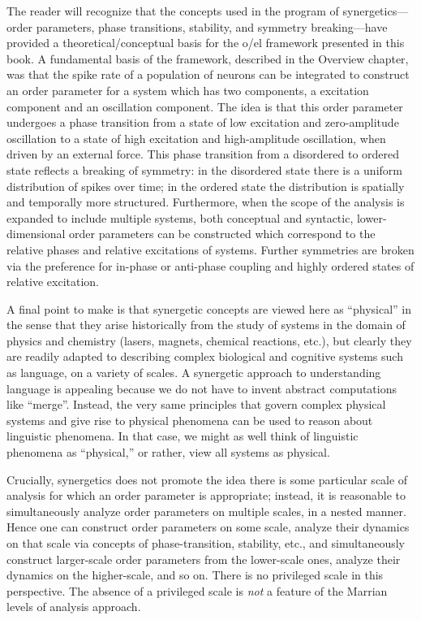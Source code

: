   The reader will recognize that the concepts used in the program of synergetics—order parameters, phase transitions, stability, and symmetry breaking—have provided a theoretical/conceptual basis for the o/el framework presented in this book. A fundamental basis of the framework, described in the Overview chapter, was that the spike rate of a population of neurons can be integrated to construct an order parameter for a system which has two components, a excitation component and an oscillation component. The idea is that this order parameter undergoes a phase transition from a state of low excitation and zero-amplitude oscillation to a state of high excitation and high-amplitude oscillation, when driven by an external force. This phase transition from a disordered to ordered state reflects a breaking of symmetry: in the disordered state there is a uniform distribution of spikes over time; in the ordered state the distribution is spatially and temporally more structured. Furthermore, when the scope of the analysis is expanded to include multiple systems, both conceptual and syntactic, lower-dimensional order parameters can be constructed which correspond to the relative phases and relative excitations of systems. Further symmetries are broken via the preference for in-phase or anti-phase coupling and highly ordered states of relative excitation.

A final point to make is that synergetic concepts are viewed here as “physical” in the sense that they arise historically from the study of systems in the domain of physics and chemistry (lasers, magnets, chemical reactions, etc.), but clearly they are readily adapted to describing complex biological and cognitive systems such as language, on a variety of scales. A synergetic approach to understanding language is appealing because we do not have to invent abstract computations like “merge”. Instead, the very same principles that govern complex physical systems and give rise to physical phenomena can be used to reason about linguistic phenomena. In that case, we might as well think of linguistic phenomena as “physical,” or rather, view all systems as physical.

 Crucially, synergetics does not promote the idea there is some particular scale of analysis for which an order parameter is appropriate; instead, it is reasonable to simultaneously analyze order parameters on multiple scales, in a nested manner. Hence one can construct order parameters on some scale, analyze their dynamics on that scale via concepts of phase-transition, stability, etc., and simultaneously construct larger-scale order parameters from the lower-scale ones, analyze their dynamics on the higher-scale, and so on. There is no privileged scale in this perspective. The absence of a privileged scale is \textit{not} a feature of the Marrian levels of analysis approach.

